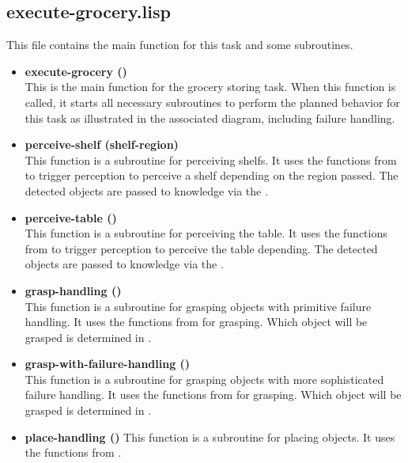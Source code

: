 \documentclass[main.tex]{subfiles}
\begin{document}
		\subsection{execute-grocery.lisp}
		This file contains the main function for this task and some subroutines.
		\begin{itemize}
			\item \textbf{execute-grocery ()} \\
			This is the main function for the grocery storing task. When this function is called, it starts all necessary subroutines to perform the planned behavior for this task as illustrated in the associated diagram, including failure handling.
			\item \textbf{perceive-shelf (shelf-region)} \\
			This function is a subroutine for perceiving shelfs. It uses the functions from  to trigger perception to perceive a shelf depending on the region passed. The detected objects are passed to knowledge via the .
			\item \textbf{perceive-table ()} \\
			This function is a subroutine for perceiving the table. It uses the functions from  to trigger perception to perceive the table depending. The detected objects are passed to knowledge via the .
			\item \textbf{grasp-handling ()} \\
			This function is a subroutine for grasping objects with primitive failure handling. It uses the functions from  for grasping. Which object will be grasped is determined in .
			\item \textbf{grasp-with-failure-handling ()} \\
			This function is a subroutine for grasping objects with more sophisticated failure handling. It uses the functions from  for grasping. Which object will be grasped is determined in .
			\item \textbf{place-handling ()}
			This function is a subroutine for placing objects. It uses the functions from .
		\end{itemize}
		
\end{document}
